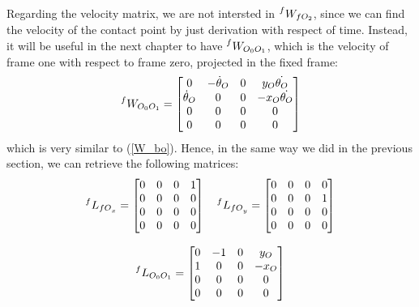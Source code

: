 \documentclass[a4paper,12pt,oneside]{report}
\begin{document}
Regarding the velocity matrix, we are not intersted in $\prescript{f}{}{W_{fO_2}}$, since we can find the velocity of the contact point by just derivation with respect of time. Instead, it will be useful in the next chapter to have $\prescript{f}{}{W_{O_0O_1}}$, which is the velocity of frame one with respect to frame zero, projected in the fixed frame: 
\begin{equation}
  \prescript{f}{}{W_{O_0O_1}}=\begin{bmatrix}
    0&-\dot{\theta}_O&0&y_O \dot{\theta_O}\\
    \dot{\theta}_O&0&0&-x_O \dot{\theta_O}\\
    0&0&0&0\\
    0&0&0&0
  \end{bmatrix}
\end{equation}
which is very similar to (\ref{W_bo}). Hence, in the same way we did in the previous section, we can retrieve the following matrices:
\begin{equation}
  \begin{array}{c}
    \prescript{f}{}{L_{{fO}_x}}=\begin{bmatrix}
      0&0&0&1\\
      0&0&0&0\\
      0&0&0&0\\
      0&0&0&0
    \end{bmatrix} \quad
    \prescript{f}{}{L_{{fO}_y}}=\begin{bmatrix}
      0&0&0&0\\
      0&0&0&1\\
      0&0&0&0\\
      0&0&0&0
    \end{bmatrix}\\ \\
    \prescript{f}{}{L_{O_0O_1}}=\begin{bmatrix}
      0&-1&0&y_O\\
      1&0&0&-x_O\\
      0&0&0&0\\
      0&0&0&0
    \end{bmatrix}
  \end{array}
\end{equation}
\end{document}
